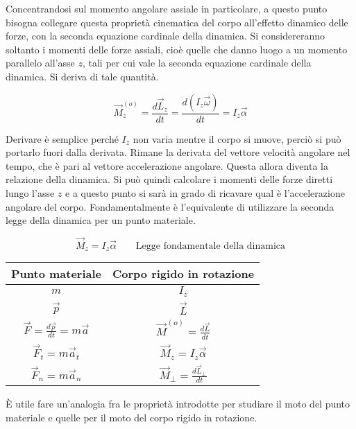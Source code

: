 Concentrandosi sul momento angolare assiale in particolare, a questo punto bisogna collegare questa proprietà cinematica del corpo all'effetto dinamico delle forze, con la seconda equazione cardinale della dinamica. Si considereranno soltanto i momenti delle forze assiali, cioè quelle che danno luogo a un momento parallelo all'asse $z$, tali per cui vale la seconda equazione cardinale della dinamica. Si deriva di tale quantità.

\[
	\vec{M}^{(o)}_z = \frac{d\vec{L}_z }{dt} = \frac{d(I_z\vec{\omega}) }{dt} = I_z \vec{\alpha}
\]

Derivare è semplice perché $I_z$ non varia mentre il corpo si muove, perciò si può portarlo fuori dalla derivata. Rimane la derivata del vettore velocità angolare nel tempo, che è pari al vettore accelerazione angolare. Questa allora diventa la relazione della dinamica. Si può quindi calcolare i momenti delle forze diretti lungo l'asse $z$ e a questo punto si sarà in grado di ricavare qual è l'accelerazione angolare del corpo. Fondamentalmente è l'equivalente di utilizzare la seconda legge della dinamica per un punto materiale.

\[
	\boxed{\vec{M}_z = I_z\vec{\alpha}} \qquad \text{Legge fondamentale della dinamica}
\]

\begin{table}[H]
		\centering
		\begin{tabular}{c|c}
			Punto materiale & Corpo rigido in rotazione \\
			\hline
			$m$ & $I_z$ \\
			$\vec{p}$ & $\vec{L}$ \\
			$\vec{F} = \frac{d\vec{p} }{dt} = m\vec{a}$ & $\vec{M}^{(o)} = \frac{d\vec{L} }{dt}$ \\
			$\vec{F}_t = m\vec{a}_t$ & $\vec{M}_z=I_z\vec{\alpha}$ \\
			$\vec{F}_n = m\vec{a}_n$ & $\vec{M}_{\bot} = \frac{d\vec{L}_{\bot} }{dt}$
		\end{tabular}
	\end{table}
È utile fare un'analogia fra le proprietà introdotte per studiare il moto del punto materiale e quelle per il moto del corpo rigido in rotazione.

